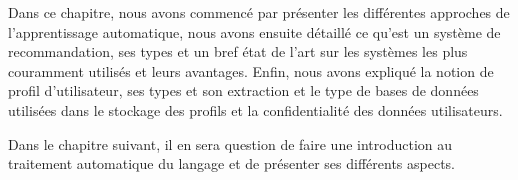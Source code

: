 Dans ce chapitre, nous avons commencé par présenter les différentes approches de l'apprentissage automatique, nous avons ensuite détaillé ce qu'est un système de recommandation, ses types et un bref état de l'art sur les systèmes les plus couramment utilisés et leurs avantages. Enfin, nous avons expliqué la notion de profil d'utilisateur, ses types et son extraction et le type de bases de données utilisées dans le stockage des profils et la confidentialité des données utilisateurs.

Dans le chapitre suivant, il en sera question de faire une introduction au traitement automatique du langage et de présenter ses différents aspects.